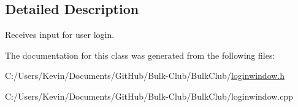 \subsection{Detailed Description}
Receives input for user login. 

The documentation for this class was generated from the following files\+:\begin{DoxyCompactItemize}
\item 
C\+:/\+Users/\+Kevin/\+Documents/\+Git\+Hub/\+Bulk-\/\+Club/\+Bulk\+Club/\mbox{\hyperlink{loginwindow_8h}{loginwindow.\+h}}\item 
C\+:/\+Users/\+Kevin/\+Documents/\+Git\+Hub/\+Bulk-\/\+Club/\+Bulk\+Club/loginwindow.\+cpp\end{DoxyCompactItemize}
